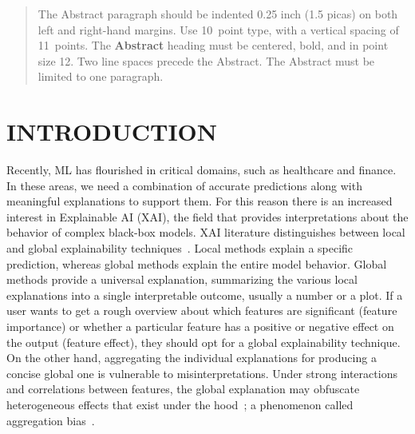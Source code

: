 \documentclass[twoside]{article}
\begin{document}
%

%


\begin{abstract}
  The Abstract paragraph should be indented 0.25 inch (1.5 picas) on
  both left and right-hand margins. Use 10~point type, with a vertical
  spacing of 11~points. The \textbf{Abstract} heading must be centered,
  bold, and in point size 12. Two line spaces precede the
  Abstract. The Abstract must be limited to one paragraph.
\end{abstract}


\section{INTRODUCTION}

Recently, ML has flourished in critical domains, such as healthcare
and finance. In these areas, we need a combination of accurate
predictions along with meaningful explanations to support them. For
this reason there is an increased interest in Explainable AI (XAI),
the field that provides interpretations about the behavior of complex
black-box models. XAI literature distinguishes between local and
global explainability
techniques~\citep{Molnar2020interpretable}. Local methods explain a
specific prediction, whereas global methods explain the entire model
behavior. Global methods provide a universal explanation, summarizing
the various local explanations into a single interpretable outcome,
usually a number or a plot. If a user wants to get a rough overview
about which features are significant (feature importance) or whether a
particular feature has a positive or negative effect on the output
(feature effect), they should opt for a global explainability
technique. On the other hand, aggregating the individual explanations
for producing a concise global one is vulnerable to
misinterpretations. Under strong interactions and correlations between
features, the global explanation may obfuscate heterogeneous effects
that exist under the hood~\citep{herbinger2022repid}; a phenomenon
called aggregation bias~\citep{mehrabi2021survey}.
\end{document}

